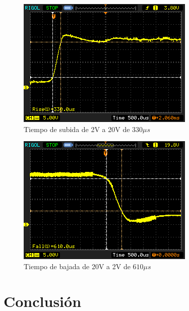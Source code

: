 \documentclass[12pt]{report}
\begin{document}
\begin{figure}[H]
	\centering
	\includegraphics[width=\textwidth,height=0.4\textheight,keepaspectratio]{rise-time}
	\caption{Tiempo de subida de 2V a 20V de 330$\mu s$}
\end{figure}

\begin{figure}[H]
	\centering
	\includegraphics[width=\textwidth,height=0.4\textheight,keepaspectratio]{fall-time}
	\caption{Tiempo de bajada de 20V a 2V de $610\mu s$}
\end{figure}

\chapter{Conclusión}
\end{document}
